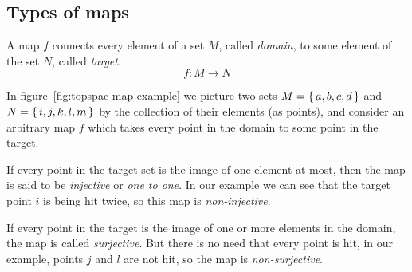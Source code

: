  \subsection{Types of maps}
  A map $f$ connects every element of a set $M$, called \emph{domain}, to some element
  of the set $N$, called \emph{target}.
  \[
    f: M \longrightarrow N
  \]

  In figure~\ref{fig:topspac-map-example} we picture two sets $M=\set{a, b, c, d}$ and
  $N=\set{i, j, k, l, m}$ by the collection of their elements (as points), and consider
  an arbitrary map $f$ which takes every point in the domain to some point in the target.
  
  If every point in the target set is the image of one element at most, then the map is
  said to be \emph{injective} or \emph{one to one}. In our example we can see that the
  target point $i$ is being hit twice, so this map is \emph{non-injective}.

  If every point in the target is the image of one or more elements in the domain, the
  map is called \emph{surjective}. But there is no need that every point is hit, in our
  example, points $j$ and $l$ are not hit, so the map is \emph{non-surjective}.

